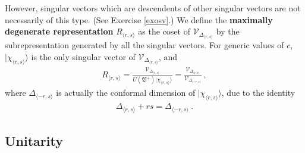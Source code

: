 \documentclass[12pt,a4paper,notitlepage]{report}
\numberwithin{equation}{section}
\theoremstyle{break}
\begin{document}
However, singular vectors which are descendents of other singular vectors are not necessarily of this type. (See 
Exercise \ref{exosv}.) We define the \textbf{\boldmath maximally degenerate representation} $R_{\langle r,s \rangle}$ as the coset of $\mathcal{V}_{\Delta_{\langle r,s \rangle}}$ by the subrepresentation generated by all the singular vectors. 
For generic values of $c$, $|\chi_{\langle r,s \rangle}\rangle$ is the only singular vector of $\mathcal{V}_{\Delta_{\langle r,s \rangle}}$, and 
\begin{align}
 R_{\langle r,s\rangle} =\frac{\mathcal{V}_{\Delta_{\langle r,s \rangle}}}{U(\mathfrak{V}^+) |\chi_{\langle r,s \rangle}\rangle }
= \frac{\mathcal{V}_{\Delta_{\langle r,s \rangle}}}{\mathcal{V}_{\Delta_{\langle -r,s \rangle}} }\ ,
\end{align}
where $\Delta_{\langle -r,s \rangle}$ is actually the conformal dimension of $|\chi_{\langle r,s \rangle}\rangle$, due to the identity
\begin{align}
 \Delta_{\langle r,s \rangle} + rs = \Delta_{\langle -r,s \rangle}\ .
\label{dmr}
\end{align}



\subsection{Unitarity \label{secuni}}
\end{document}
